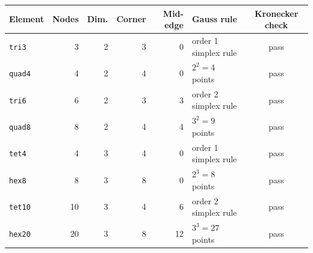 \begin{tabular}{@{}l r r r r l c@{}}
\toprule
Element & Nodes & Dim. & Corner & Mid-edge & Gauss rule & Kronecker check \\
\midrule
\texttt{tri3} & 3 & 2 & 3 & 0 & order 1 simplex rule & pass \\
\texttt{quad4} & 4 & 2 & 4 & 0 & $2^2=4$ points & pass \\
\texttt{tri6} & 6 & 2 & 3 & 3 & order 2 simplex rule & pass \\
\texttt{quad8} & 8 & 2 & 4 & 4 & $3^2=9$ points & pass \\
\texttt{tet4} & 4 & 3 & 4 & 0 & order 1 simplex rule & pass \\
\texttt{hex8} & 8 & 3 & 8 & 0 & $2^3=8$ points & pass \\
\texttt{tet10} & 10 & 3 & 4 & 6 & order 2 simplex rule & pass \\
\texttt{hex20} & 20 & 3 & 8 & 12 & $3^3=27$ points & pass \\
\bottomrule
\end{tabular}
